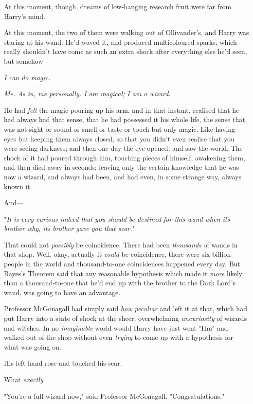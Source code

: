 At this moment, though, dreams of low-hanging research fruit were far from
Harry's mind.

At this moment, the two of them were walking out of Ollivander's, and Harry was
staring at his wand. He'd waved it, and produced multicoloured sparks, which
really shouldn't have come as such an extra shock after everything else he'd
seen, but somehow—

\emph{I can do magic.}

\emph{Me. As in, me personally. I am magical; I am a wizard.}

He had \emph{felt} the magic pouring up his arm, and in that instant, realised
that he had always had that sense, that he had possessed it his whole life, the
sense that was not sight or sound or smell or taste or touch but only magic.
Like having eyes but keeping them always closed, so that you didn't even
realise that you were seeing darkness; and then one day the eye opened, and saw
the world. The shock of it had poured through him, touching pieces of himself,
awakening them, and then died away in seconds; leaving only the certain
knowledge that he was now a wizard, and always had been, and had even, in some
strange way, always known it.

And—

"\emph{It is very curious indeed that you should be destined for this wand when
its brother why, its brother gave you that scar.}"

That could not \emph{possibly} be coincidence. There had been \emph{thousands}
of wands in that shop. Well, okay, actually it \emph{could} be coincidence,
there were six billion people in the world and thousand-to-one coincidences
happened every day. But Bayes's Theorem said that any reasonable hypothesis
which made it \emph{more} likely than a thousand-to-one that he'd end up with
the brother to the Dark Lord's wand, was going to have an advantage.

Professor McGonagall had simply said \emph{how peculiar} and left it at that,
which had put Harry into a state of shock at the sheer, overwhelming
\emph{uncuriosity} of wizards and witches. In no \emph{imaginable} world would
Harry have just went "Hm" and walked out of the shop without even \emph{trying}
to come up with a hypothesis for what was going on.

His left hand rose and touched his scar.

What{\el} \emph{exactly{\el}}

"You're a full wizard now," said Professor McGonagall. "Congratulations."

